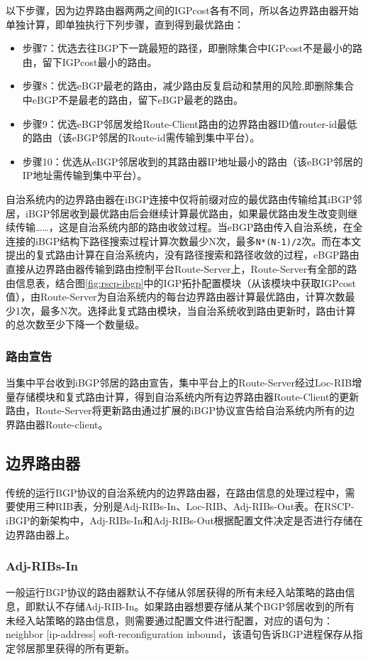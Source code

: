 以下步骤，因为边界路由器两两之间的IGPcost各有不同，所以各边界路由器开始单独计算，即单独执行下列步骤，直到得到最优路由：
\begin{itemize}
    \item 步骤7：优选去往BGP下一跳最短的路径，即删除集合中IGPcost不是最小的路由，留下IGPcost最小的路由。
    \item 步骤8：优选eBGP最老的路由，减少路由反复启动和禁用的风险,即删除集合中eBGP不是最老的路由，留下eBGP最老的路由。
    \item 步骤9：优选eBGP邻居发给Route-Client路由的边界路由器ID值router-id最低的路由（该eBGP邻居的Route-id需传输到集中平台）。
    \item 步骤10：优选从eBGP邻居收到的其路由器IP地址最小的路由（该eBGP邻居的IP地址需传输到集中平台）。
\end{itemize}


自治系统内的边界路由器在iBGP连接中仅将前缀对应的最优路由传输给其iBGP邻居，iBGP邻居收到最优路由后会继续计算最优路由，如果最优路由发生改变则继续传输……，这是自治系统内部的路由收敛过程。当eBGP路由传入自治系统，在全连接的iBGP结构下路径搜索过程计算次数最少N次，最多\verb+N*(N-1)/2+次。而在本文提出的复式路由计算在自治系统内，没有路径搜索和路径收敛的过程，eBGP路由直接从边界路由器传输到路由控制平台Route-Server上，Route-Server有全部的路由信息表，结合图\ref{fig:rscp-ibgp}中的IGP拓扑配置模块（从该模块中获取IGPcost值），由Route-Server为自治系统内的每台边界路由器计算最优路由，计算次数最少1次，最多N次。选择此复式路由模块，当自治系统收到路由更新时，路由计算的总次数至少下降一个数量级。

\subsubsection{路由宣告}
当集中平台收到iBGP邻居的路由宣告，集中平台上的Route-Server经过Loc-RIB增量存储模块和复式路由计算，得到自治系统内所有边界路由器Route-Client的更新路由，Route-Server将更新路由通过扩展的iBGP协议宣告给自治系统内所有的边界路由器Route-client。

\subsection{边界路由器}
传统的运行BGP协议的自治系统内的边界路由器，在路由信息的处理过程中，需要使用三种RIB表，分别是Adj-RIBs-In、Loc-RIB、Adj-RIBs-Out表。在RSCP-iBGP的新架构中，Adj-RIBs-In和Adj-RIBs-Out根据配置文件决定是否进行存储在边界路由器上。

\subsubsection{Adj-RIBs-In}
一般运行BGP协议的路由器默认不存储从邻居获得的所有未经入站策略的路由信息，即默认不存储Adj-RIB-In。如果路由器想要存储从某个BGP邻居收到的所有未经入站策略的路由信息，则需要通过配置文件进行配置，对应的语句为：neighbor [ip-address] soft-reconfiguration inbound，该语句告诉BGP进程保存从指定邻居那里获得的所有更新。


